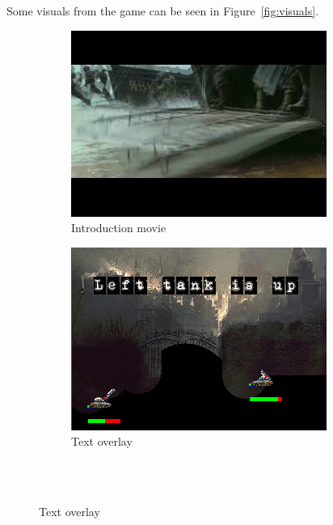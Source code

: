 \documentclass[a4paper,10pt]{article}
\begin{document}
Some visuals from the game can be seen in Figure~\ref{fig:visuals}.

\begin{figure}[!h]
    \centering

    \begin{subfigure}[!h]{0.48\textwidth}
        \includegraphics[width=\textwidth]{sc_intro_movie.png}
        \caption{Introduction movie}
    \end{subfigure}
    \begin{subfigure}[!h]{0.48\textwidth}
        \includegraphics[width=\textwidth]{sc_text.png}
        \caption{Text overlay}
    \end{subfigure}
    \\
    \ \\
    \vspace{20pt}

\end{figure}
\end{document}

